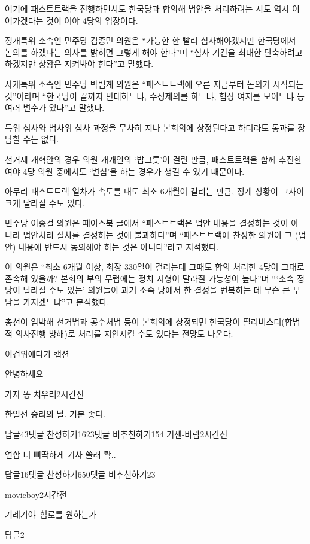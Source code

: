 \documentclass[final,doctor,korean,pdfdoc]{konkukthesis}
\begin{document}
여기에 패스트트랙을 진행하면서도 한국당과 합의해 법안을 처리하려는 시도 역시 이어가겠다는 것이 여야 4당의 입장이다.

정개특위 소속인 민주당 김종민 의원은 ``가능한 한 빨리 심사해야겠지만 한국당에서 논의를 하겠다는 의사를 밝히면 그렇게 해야 한다''며 ``심사 기간을 최대한 단축하려고 하겠지만 상황은 지켜봐야 한다''고 말했다.

사개특위 소속인 민주당 박범계 의원은 ``패스트트랙에 오른 지금부터 논의가 시작되는 것''이라며 ``한국당이 끝까지 반대하느냐, 수정제의를 하느냐, 협상 여지를 보이느냐 등 여러 변수가 있다''고 말했다.

특위 심사와 법사위 심사 과정을 무사히 지나 본회의에 상정된다고 하더라도 통과를 장담할 수는 없다.

선거제 개혁안의 경우 의원 개개인의 `밥그릇'이 걸린 만큼, 패스트트랙을 함께 추진한 여야 4당 의원 중에서도 `변심'을 하는 경우가 생길 수 있기 때문이다.

아무리 패스트트랙 열차가 속도를 내도 최소 6개월이 걸리는 만큼, 정계 상황이 그사이 크게 달라질 수도 있다.

민주당 이종걸 의원은 페이스북 글에서 ``패스트트랙은 법안 내용을 결정하는 것이 아니라 법안처리 절차를 결정하는 것에 불과하다''며 ``패스트트랙에 찬성한 의원이 그 (법안) 내용에 반드시 동의해야 하는 것은 아니다''라고 지적했다.

이 의원은 ``최소 6개월 이상, 최장 330일이 걸리는데 그때도 합의 처리한 4당이 그대로 존속해 있을까? 본회의 부의 무렵에는 정치 지형이 달라질 가능성이 높다''며 ```소속 정당이 달라질 수도 있는' 의원들이 과거 소속 당에서 한 결정을 번복하는 데 무슨 큰 부담을 가지겠느냐''고 분석했다.

총선이 임박해 선거법과 공수처법 등이 본회의에 상정되면 한국당이 필리버스터(합법적 의사진행 방해)로 처리를 지연시킬 수도 있다는 전망도 나온다.
\begin{table}
 \caption{이건위에다가 캡션}
 안녕하세요 
\end{table}

\clearpage

\begin{abstractKor}
\indent
가자 똥 치우러2시간전 \par
한일전 승리의 날. 기분 좋다. \par
답글43댓글 찬성하기1623댓글 비추천하기154 
\textbf{}
거센-바람2시간전 \par
연합 너 삐딱하게 기사 쓸래 콱.. \par
답글16댓글 찬성하기650댓글 비추천하기23 

movieboy2시간전 \par 
기레기야\, 험로를 원하는가 \par 
답글2
\end{abstractKor}
\end{document}
